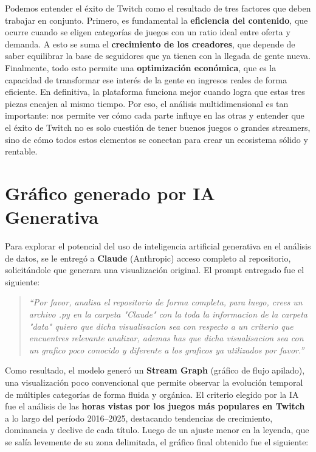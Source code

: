 \documentclass[12pt,a4paper]{article}
\begin{document}
Podemos entender el éxito de Twitch como el resultado de tres factores que deben trabajar en conjunto. Primero, es fundamental la \textbf{eficiencia del contenido}, que ocurre cuando se eligen categorías de juegos con un ratio ideal entre oferta y demanda. A esto se suma el \textbf{crecimiento de los creadores}, que depende de saber equilibrar la base de seguidores que ya tienen con la llegada de gente nueva. Finalmente, todo esto permite una \textbf{optimización económica}, que es la capacidad de transformar ese interés de la gente en ingresos reales de forma eficiente. En definitiva, la plataforma funciona mejor cuando logra que estas tres piezas encajen al mismo tiempo. Por eso, el análisis multidimensional es tan importante: nos permite ver cómo cada parte influye en las otras y entender que el éxito de Twitch no es solo cuestión de tener buenos juegos o grandes streamers, sino de cómo todos estos elementos se conectan para crear un ecosistema sólido y rentable.

\newpage
\section{Gráfico generado por IA Generativa}

Para explorar el potencial del uso de inteligencia artificial generativa en el análisis de datos, se le entregó a \textbf{Claude} (Anthropic) acceso completo al repositorio, solicitándole que generara una visualización original. El prompt entregado fue el siguiente:

\begin{quote}
\textit{``Por favor, analisa el repositorio de forma completa, para luego, crees un archivo .py en la carpeta "Claude" con la toda la informacion de la carpeta "data" quiero que dicha visualisacion sea con respecto a un criterio que encuentres relevante analizar, ademas has que dicha visualisacion sea con un grafico poco conocido y diferente a los graficos ya utilizados por favor.''}
\end{quote}

Como resultado, el modelo generó un \textbf{Stream Graph} (gráfico de flujo apilado), una visualización poco convencional que permite observar la evolución temporal de múltiples categorías de forma fluida y orgánica. El criterio elegido por la IA fue el análisis de las \textbf{horas vistas por los juegos más populares en Twitch} a lo largo del período 2016--2025, destacando tendencias de crecimiento, dominancia y declive de cada título. Luego de un ajuste menor en la leyenda, que se salía levemente de su zona delimitada, el gráfico final obtenido fue el siguiente:
\end{document}
